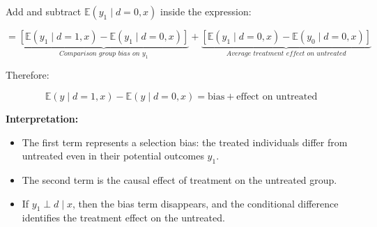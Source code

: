 \documentclass[12pt]{article}
\begin{document}
Add and subtract \( \mathbb{E}(y_1 \mid d = 0, x) \) inside the expression:

\[
= \underbrace{\left[ \mathbb{E}(y_1 \mid d = 1, x) - \mathbb{E}(y_1 \mid d = 0, x) \right]}_{\textit{Comparison group bias on } y_1}
+ \underbrace{\left[ \mathbb{E}(y_1 \mid d = 0, x) - \mathbb{E}(y_0 \mid d = 0, x) \right]}_{\textit{Average treatment effect on untreated}}
\]

Therefore:

\[
\mathbb{E}(y \mid d = 1, x) - \mathbb{E}(y \mid d = 0, x)
= \text{bias} + \text{effect on untreated}
\]

\textbf{Interpretation:}
\begin{itemize}
    \item The first term represents a selection bias: the treated individuals differ from untreated even in their potential outcomes \( y_1 \).
    \item The second term is the causal effect of treatment on the untreated group.
    \item If \( y_1 \perp d \mid x \), then the bias term disappears, and the conditional difference identifies the treatment effect on the untreated.
\end{itemize}
\end{document}
